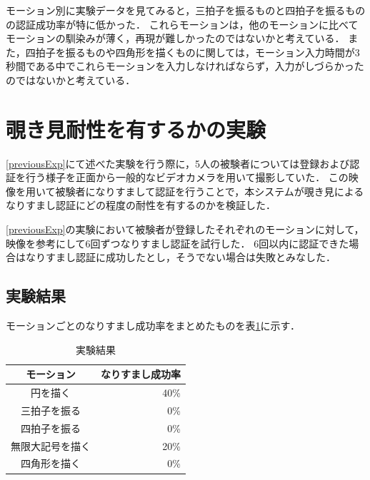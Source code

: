 \documentclass[12pt]{jreport}
\begin{document}
    モーション別に実験データを見てみると，三拍子を振るものと四拍子を振るものの認証成功率が特に低かった．
    これらモーションは，他のモーションに比べてモーションの馴染みが薄く，再現が難しかったのではないかと考えている．
    また，四拍子を振るものや四角形を描くものに関しては，モーション入力時間が3秒間である中でこれらモーションを入力しなければならず，入力がしづらかったのではないかと考えている．

    \section{覗き見耐性を有するかの実験}
    \ref{previousExp}にて述べた実験を行う際に，5人の被験者については登録および認証を行う様子を正面から一般的なビデオカメラを用いて撮影していた．
    この映像を用いて被験者になりすまして認証を行うことで，本システムが覗き見によるなりすまし認証にどの程度の耐性を有するのかを検証した．

    \ref{previousExp}の実験において被験者が登録したそれぞれのモーションに対して，映像を参考にして6回ずつなりすまし認証を試行した．
    6回以内に認証できた場合はなりすまし認証に成功したとし，そうでない場合は失敗とみなした．

    \subsection{実験結果}
    モーションごとのなりすまし成功率をまとめたものを表\ref{spoofing}に示す．

    \begin{table}[htb]
        \begin{center}
            \caption{実験結果}
            \label{spoofing}
            \begin{tabular}{|c|r|} \hline
                モーション & なりすまし成功率 \\ \hline \hline
                円を描く & 40\% \\ \hline
                三拍子を振る & 0\% \\ \hline
                四拍子を振る & 0\% \\ \hline
                無限大記号を描く & 20\% \\ \hline
                四角形を描く & 0\% \\ \hline
            \end{tabular}
        \end{center}
    \end{table}
\end{document}
